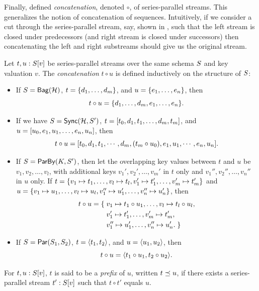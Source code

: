 Finally,  defined \emph{concatenation}, denoted $\circ$, of series-parallel streams.
This generalizes the notion of concatenation of sequences.
Intuitively, if we consider a cut through the series-parallel stream, say, shown in , such that the left stream is closed under predecessors (and right stream
is closed under successors) then concatenating the left and right substreams should give us the
original stream.

\begin{definition}
\label{45:def:trace-concat}
Let $t, u: \spstype{v}{\ss}$ be series-parallel streams over the same schema $\ss$ and key valuation $v$.
The  \emph{concatenation} $t \circ u$ is defined inductively on the structure of $\ss$:
\begin{itemize}
\item If $\ss = \relleaf{\mathcal{H}}$,
$t = \spsbag{d_1, \ldots, d_m}$,
and $u = \spsbag{e_1, \ldots, e_n}$,
then
\[t \circ u = \spsbag{d_1, \ldots, d_m, e_1, \ldots, e_n}.\]
\item If we have $\ss = \hier{\mathcal{H}}{\ss'}$,
$t = \spsseq{t_0, d_1, t_1, \ldots, d_m, t_m}$,
and
$u = \spsseq{u_0, e_1, u_1, \ldots, e_n, u_n}$,
then
\[t \circ u =
\spsseq{t_0, d_1, t_1, \cdots, d_m, (t_m \circ u_0), e_1, u_1, \cdots, e_n, u_n}.
\]
\item If $\ss = \keyby{K}{S'}$,
then let the overlapping key values between $t$ and $u$ be
$v_1, v_2, \ldots, v_l$,
with additional keys $v_1', v_2', \ldots, v_m'$ in $t$ only
and $v_1'', v_2'', \ldots, v_n''$ in $u$ only.
If
$t = \spsbag{\keyed{v_1}{t_1}, \ldots, \keyed{v_l}{t_l},
\keyed{v_1'}{t_1'}, \ldots, \keyed{v_m'}{t_m'}}$
and
$u = \spsbag{\keyed{v_1}{u_1}, \ldots, \keyed{v_l}{u_l},
\keyed{v_1''}{u_1'}, \ldots, \keyed{v_n''}{u_n'}}$,
then
\begin{align*}
t \circ u = \spsbagleft{}
&\keyed{v_1}{t_1 \circ u_1}, \ldots, \keyed{v_l}{t_l \circ u_l}, \\
&\keyed{v_1'}{t_1'}, \ldots, \keyed{v_m'}{t_m'}, \\
&\keyed{v_1''}{u_1'}, \ldots, \keyed{v_n''}{u_n'}.\spsbagright{}
\end{align*}
\item If $\ss = \parcomp{\ss_1}{\ss_2}$,
$t = \spspar{t_1}{t_2}$, and $u = \spspar{u_1}{u_2}$,
then
\[
t \circ u = \spspar{t_1 \circ u_1}{t_2 \circ u_2}.
\]
\end{itemize}
For $t, u: \spstype{v}{\ss}$, $t$ is said to be a {\em prefix} of $u$, written $t\prefix u$,
if there exists a series-parallel stream $t' : \spstype{v}{\ss}$ such that $t\circ t'$
equals $u$.
\end{definition}

